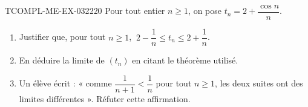 \begin{exercice}{TCOMPL-ME-EX-032}{2}{20}
Pour tout entier $n \geq 1$, on pose $t_n = 2 + \dfrac{\cos n}{n}$.
\begin{enumerate}
  \item Justifier que, pour tout $n \geq 1$, $\ 2-\dfrac{1}{n} \leq t_n \leq 2+\dfrac{1}{n}$.
  \item En déduire la limite de $(t_n)$ en citant le théorème utilisé.
  \item Un élève écrit : « comme $\dfrac{1}{n+1} < \dfrac{1}{n}$ pour tout $n \geq 1$, les deux suites ont des limites différentes ». Réfuter cette affirmation.
\end{enumerate}
\end{exercice}

